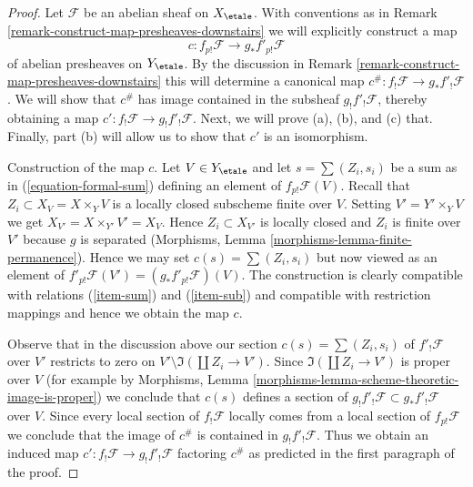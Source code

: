 \begin{proof}
Let $\mathcal{F}$ be an abelian sheaf on $X_\etale$. With conventions as in
Remark \ref{remark-construct-map-presheaves-downstairs} we will explicitly
construct a map
$$
c : f_{p!}\mathcal{F} \longrightarrow g_*f'_{p!}\mathcal{F}
$$
of abelian presheaves on $Y_\etale$. By the discussion in
Remark \ref{remark-construct-map-presheaves-downstairs}
this will determine a canonical map
$c^\# : f_!\mathcal{F} \to g_*f'_!\mathcal{F}$.
We will show that $c^\#$ has image contained in the subsheaf
$g_!f'_!\mathcal{F}$, thereby obtaining a map
$c' : f_!\mathcal{F} \to g_!f'_!\mathcal{F}$. Next, we will prove
(a), (b), and (c) that. Finally, part (b)
will allow us to show that $c'$ is an isomorphism.

\medskip\noindent
Construction of the map $c$. Let $V \in Y_\etale$ and
let $s = \sum (Z_i, s_i)$ be a sum as in (\ref{equation-formal-sum})
defining an element of $f_{p!}\mathcal{F}(V)$.
Recall that $Z_i \subset X_V = X \times_Y V$
is a locally closed subscheme finite over $V$.
Setting $V' = Y' \times_Y V$ we get $X_{V'} = X \times_{Y'} V' = X_V$.
Hence $Z_i \subset X_{V'}$ is locally closed and
$Z_i$ is finite over $V'$ because $g$ is separated
(Morphisms, Lemma \ref{morphisms-lemma-finite-permanence}).
Hence we may set $c(s) = \sum (Z_i, s_i)$ but now viewed
as an element of $f'_{p!}\mathcal{F}(V') = (g_*f'_{p!}\mathcal{F})(V)$.
The construction is clearly compatible with relations
(\ref{item-sum}) and (\ref{item-sub})
and compatible with restriction mappings and hence we obtain the map $c$.

\medskip\noindent
Observe that in the discussion above our section $c(s) = \sum (Z_i, s_i)$ of
$f'_!\mathcal{F}$ over $V'$ restricts to zero on
$V' \setminus \Im(\coprod Z_i \to V')$. Since $\Im(\coprod Z_i \to V')$
is proper over $V$ (for example by Morphisms, Lemma
\ref{morphisms-lemma-scheme-theoretic-image-is-proper})
we conclude that $c(s)$ defines a section of
$g_!f'_!\mathcal{F} \subset g_*f'_!\mathcal{F}$ over $V$.
Since every local section of $f_!\mathcal{F}$ locally comes from a
local section of $f_{p!}\mathcal{F}$ we conclude that the image
of $c^\#$ is contained in $g_!f'_!\mathcal{F}$.
Thus we obtain an induced map $c' : f_!\mathcal{F} \to g_!f'_!\mathcal{F}$
factoring $c^\#$ as predicted in the first paragraph of the proof.


\end{proof}

